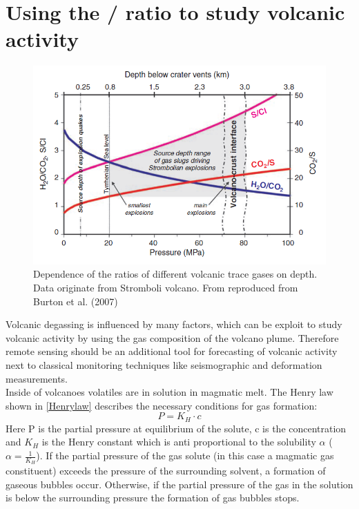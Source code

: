\documentclass  [
  paper    = a4,
  BCOR     = 10mm,
  twoside,
  fontsize = 12pt,
  fleqn,
  toc      = bibnumbered,
  toc      = listofnumbered,
  numbers  = noendperiod,
  headings = normal,
  listof   = leveldown,
  version  = 3.03
]                                       {scrreprt}
\begin{document}
\section{Using the /  ratio to study volcanic activity}
\begin{figure}
	\centering
	\includegraphics[width=0.9\linewidth]{Zwischenbericht2018/Bilder/so2_bro}
	\caption{Dependence of the ratios of different volcanic trace gases on depth. Data originate from Stromboli volcano. From \citet{lubcke2014optical} reproduced from Burton et al. (2007)}
	\label{fig:so2bro}
\end{figure}    
	Volcanic degassing is influenced by many factors, which can be exploit to study volcanic activity by using the gas composition of the volcano plume. Therefore remote sensing should be an additional tool for forecasting of volcanic activity next to classical monitoring techniques like seismographic and deformation measurements.\\
	Inside of volcanoes volatiles are in solution in magmatic melt. The Henry law shown in \cref{Henrylaw} describes the necessary conditions for gas formation:
	\begin{equation}
	P = K_{H}\cdot c
	\label{Henrylaw}
	\end{equation}
	Here P is the partial pressure at equilibrium of the solute, c is the concentration and $ K_{H}$ is the Henry constant which is anti proportional to the solubility $\alpha$ ($\alpha = \frac{1}{ K_{H}}$).
	If the partial pressure of the gas solute (in this case a magmatic gas constituent) exceeds the pressure of the surrounding solvent, a formation of gaseous bubbles occur. Otherwise, if the partial pressure of the gas in the solution is below the surrounding pressure the formation of gas bubbles stops.\\
\end{document}
